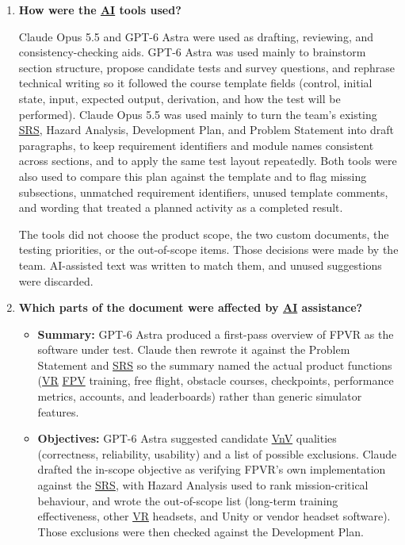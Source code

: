 \documentclass[12pt, titlepage]{article}
\begin{document}
\begin{enumerate}
    \item \textbf{How were the \hyperlink{abbr:AI}{AI} tools used?}

    Claude Opus 5.5 and GPT-6 Astra were used as drafting, reviewing, and
    consistency-checking aids. GPT-6 Astra was used mainly to brainstorm
    section structure, propose candidate tests and survey questions, and
    rephrase technical writing so it followed the course template fields
    (control, initial state, input, expected output, derivation, and how
    the test will be performed). Claude Opus 5.5 was used mainly to turn
    the team's existing \hyperlink{abbr:SRS}{SRS}, Hazard Analysis, Development Plan, and Problem
    Statement into draft paragraphs, to keep requirement identifiers and
    module names consistent across sections, and to apply the same test
    layout repeatedly. Both tools were also used to compare this plan
    against the template and to flag missing subsections, unmatched
    requirement identifiers, unused template comments, and wording that
    treated a planned activity as a completed result.

    The tools did not choose the product scope, the two custom documents,
    the testing priorities, or the out-of-scope items. Those decisions
    were made by the team. AI-assisted text was written to match them, and
    unused suggestions were discarded.

    \item \textbf{Which parts of the document were affected by \hyperlink{abbr:AI}{AI}
    assistance?}

    \begin{itemize}
        \item \textbf{Summary:} GPT-6 Astra produced a first-pass overview
        of FPVR as the software under test. Claude then rewrote it against
        the Problem Statement and \hyperlink{abbr:SRS}{SRS} so the summary named the actual
        product functions (\hyperlink{abbr:VR}{VR} \hyperlink{abbr:FPV}{FPV} training, free flight, obstacle courses,
        checkpoints, performance metrics, accounts, and leaderboards)
        rather than generic simulator features.

        \item \textbf{Objectives:} GPT-6 Astra suggested candidate \hyperlink{abbr:VnV}{VnV}
        qualities (correctness, reliability, usability) and a list of
        possible exclusions. Claude drafted the in-scope objective as
        verifying FPVR's own implementation against the \hyperlink{abbr:SRS}{SRS}, with Hazard
        Analysis used to rank mission-critical behaviour, and wrote the
        out-of-scope list (long-term training effectiveness, other \hyperlink{abbr:VR}{VR}
        headsets, and Unity or vendor headset software). Those exclusions
        were then checked against the Development Plan.


\end{itemize}
\end{enumerate}
\end{document}

